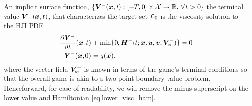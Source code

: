 An implicit surface function, $\{\bm{V}^-{(\bm{x}, t)}: \left[-T, 0\right] \times \mathcal{X}\rightarrow\mathbb{R}, \, \forall \, t>0\}$ \ie the terminal value $\bm{V}^- {(\bm{x}, t)}$, that characterizes the target set $\mathcal{L}_0$ is the viscosity solution to the HJI PDE
%
\begin{subequations}
	\begin{align}
		\frac{\partial \bm{V}^-}{\partial t}{(\bm{x}, t)} & + \min \{0, \bm{H}^- (t; \bm{x}, \bm{u}, \bm{v},\bm{V}^-_{\bm{x}}) \} = 0 \\
		\bm{V}^-(\bm{x},0) &= g(\bm{x}),
	\end{align}
	\label{eq:lower_hji_pde}
\end{subequations}
%
\noindent where the vector field $\bm{V}^-_{\bm{x}}$ is known in terms of the game's terminal conditions so that the overall game is akin to a two-point boundary-value problem. Henceforward, for ease of readability, we will remove the minus superscript on the lower value and Hamiltonian \eqref{eq:lower_visc_ham}. 
%





